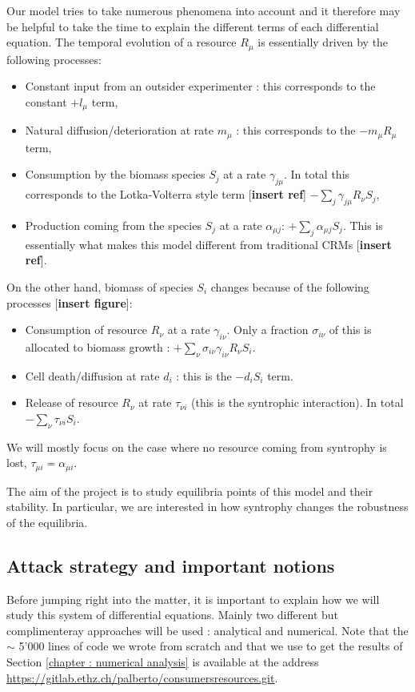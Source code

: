 \documentclass[12pt, titlepage]{report}
\begin{document}
Our model tries to take numerous phenomena into account and it therefore may be helpful to take the time to explain the different terms of each differential equation. The temporal evolution of a resource $R_\mu$ is essentially driven by the following processes:
\begin{itemize}
  \item Constant input from an outsider experimenter : this corresponds to the constant $+l_\mu$ term,
  \item Natural diffusion/deterioration at rate $m_\mu$ : this corresponds to the $-m_\mu R_\mu$ term,
  \item Consumption by the biomass species $S_j$ at a rate $\gamma_{j\mu}$. In total this corresponds to the Lotka-Volterra style term [\textbf{insert ref}] $-\sum_j \gamma_{j\mu}R_\nu S_j$,
  \item Production coming from the species $S_j$ at a rate $\alpha_{\mu j}$: $+\sum_j \alpha_{\mu j} S_j$. This is essentially what makes this model different from traditional CRMs [\textbf{insert ref}].
\end{itemize}
On the other hand, biomass of species $S_i$ changes because of the following processes [\textbf{insert figure}]:
\begin{itemize}
  \item Consumption of resource $R_\nu$ at a rate $\gamma_{i\nu}$. Only a fraction $\sigma_{i\nu}$ of this is allocated to biomass growth : $+\sum_\nu \sigma_{i\nu} \gamma_{i\nu}R_\nu S_i$.
  \item Cell death/diffusion at rate $d_i$ : this is the $-d_i S_i$ term.
  \item Release of resource $R_\nu$ at rate $\tau_{\nu i}$ (this is the syntrophic interaction). In total $-\sum_\nu \tau_{\nu i} S_i$.
\end{itemize}
We will mostly focus on the case where no resource coming from syntrophy is lost, \ie $\tau_{\mu i} = \alpha_{\mu i}$.

The aim of the project is to study equilibria points of this model and their stability. In particular, we are interested in how syntrophy changes the robustness of the equilibria.

\subsection{Attack strategy and important notions}
Before jumping right into the matter, it is important to explain how we will study this system of differential equations. Mainly two different but complimenteray approaches will be used : analytical and numerical. Note that the $\sim$ 5'000 lines of code we wrote from scratch and that we use to get the results of Section \ref{chapter : numerical analysis} is available at the address \url{https://gitlab.ethz.ch/palberto/consumersresources.git}.
\end{document}
